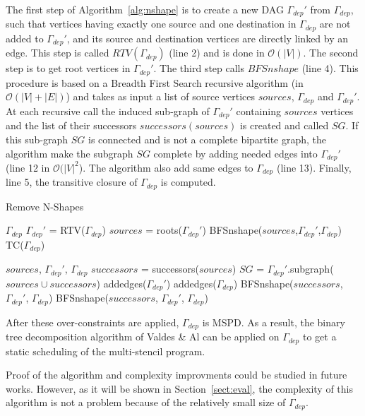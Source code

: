 The first step of Algorithm~\ref{alg:nshape} is to create a new DAG $\Gamma_{dep}'$ from $\Gamma_{dep}$, such that vertices having exactly one source and one destination in $\Gamma_{dep}$ are not added to $\Gamma_{dep}'$, and its source and destination vertices are directly linked by an edge. This step is called $RTV(\Gamma_{dep})$ (line 2) and is done in $\mathcal{O}(|V|)$. The second step is to get root vertices in $\Gamma_{dep}'$. The third step calls $BFSnshape$ (line 4). This procedure is based on a Breadth First Search recursive algorithm (in $\mathcal{O}(|V|+|E|)$) and takes as input a list of source vertices $sources$, $\Gamma_{dep}$ and $\Gamma_{dep}'$. At each recursive call the induced sub-graph of $\Gamma_{dep}'$ containing $sources$ vertices and the list of their successors $successors(sources)$ is created and called $SG$. If this sub-graph $SG$ is connected and is not a complete bipartite graph, the algorithm make the subgraph $SG$ complete by adding needed edges into $\Gamma_{dep}'$ (line 12 in $\mathcal{O}(|V|^2$). The algorithm also add same edges to $\Gamma_{dep}$ (line 13). Finally, line 5, the transitive closure of $\Gamma_{dep}$ is computed.

\begin{algorithm}
\caption{Remove N-Shapes}
\label{alg:nshape}
\begin{algorithmic}[1]
 {$\Gamma_{dep}$}
\State $\Gamma_{dep}'$ = RTV($\Gamma_{dep}$)
\State $sources$ = roots($\Gamma_{dep}'$)
\State BFSnshape($sources$,$\Gamma_{dep}'$,$\Gamma_{dep}$)
\State TC($\Gamma_{dep}$)
\EndProcedure

 {$sources$, $\Gamma_{dep}'$, $\Gamma_{dep}$}
\State $successors$ = successors($sources$)
\State $SG$ = $\Gamma_{dep}'$.subgraph($sources \cup successors$)
\State addedges($\Gamma_{dep}'$)
\State addedges($\Gamma_{dep}$)
\State BFSnshape($successors$, $\Gamma_{dep}'$, $\Gamma_{dep}$)
\State BFSnshape($successors$, $\Gamma_{dep}'$, $\Gamma_{dep}$)
\EndIf
\EndIf
\EndProcedure
\end{algorithmic}
\end{algorithm}

After these over-constraints are applied, $\Gamma_{dep}$ is MSPD. As a result, the binary tree decomposition algorithm of Valdes \& Al can be applied on $\Gamma_{dep}$ to get a static scheduling of the multi-stencil program.

Proof of the algorithm and complexity improvments could be studied in future works. However, as it will be shown in Section~\ref{sect:eval}, the complexity of this algorithm is not a problem because of the relatively small size of $\Gamma_{dep}$.

